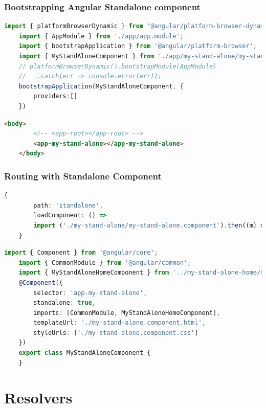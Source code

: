 \documentclass{report}
\begin{document}
\subsection{Bootstrapping Angular Standalone component}

\begin{lstlisting}[caption=main.ts, language=Typescript]
	import { platformBrowserDynamic } from '@angular/platform-browser-dynamic';
	import { AppModule } from './app/app.module';
	import { bootstrapApplication } from '@angular/platform-browser';
	import { MyStandAloneComponent } from './app/my-stand-alone/my-stand-alone.component';
	// platformBrowserDynamic().bootstrapModule(AppModule)
	//   .catch(err => console.error(err));
	bootstrapApplication(MyStandAloneComponent, {
		providers:[]
	})
\end{lstlisting}


\begin{lstlisting}[caption=index.html, language=HTML]
	<body>
		<!-- <app-root></app-root> -->
		<app-my-stand-alone></app-my-stand-alone>
	</body>
\end{lstlisting}

\subsection{Routing with Standalone Component}
\begin{lstlisting}[caption=app-router.module.ts, language=Typescript]
	{	
		path: 'standalone',
		loadComponent: () => 
		import ('./my-stand-alone/my-stand-alone.component').then((m) => m.MyStandAloneComponent),
	}
\end{lstlisting}


\begin{lstlisting}[caption=my-stand-alone-home.component.ts, language=Typescript]
	import { Component } from '@angular/core';
	import { CommonModule } from '@angular/common';
	import { MyStandAloneHomeComponent } from '../my-stand-alone-home/my-stand-alone-home.component';
	@Component({
		selector: 'app-my-stand-alone',
		standalone: true,
		imports: [CommonModule, MyStandAloneHomeComponent],
		templateUrl: './my-stand-alone.component.html',
		styleUrls: ['./my-stand-alone.component.css']
	})
	export class MyStandAloneComponent {
	}
\end{lstlisting}

\chapter{Resolvers}
\end{document}
